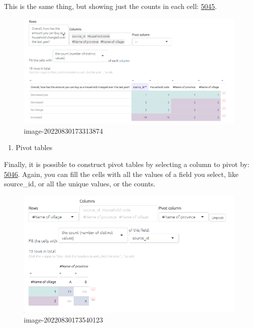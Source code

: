 \documentclass[
]{book}
\providecommand{\tightlist}{%
  \setlength{\itemsep}{0pt}\setlength{\parskip}{0pt}}
\begin{document}
This is the same thing, but showing just the counts in each cell: \href{https://causalmap.shinyapps.io/tokyo/?s=5045}{5045}.

\begin{figure}
\centering
\includegraphics{_assets/image-20220830173313874.png}
\caption{image-20220830173313874}
\end{figure}

\begin{enumerate}
\def\labelenumi{\arabic{enumi}.}
\setcounter{enumi}{2}
\tightlist
\item
  Pivot tables
\end{enumerate}

Finally, it is possible to construct pivot tables by selecting a column to pivot by: \href{https://causalmap.shinyapps.io/tokyo/?s=5046}{5046}. Again, you can fill the cells with all the values of a field you select, like source\_id, or all the unique values, or the counts.

\begin{figure}
\centering
\includegraphics{_assets/image-20220830173540123.png}
\caption{image-20220830173540123}
\end{figure}
\end{document}
